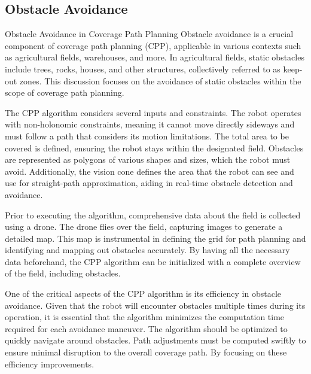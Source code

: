 
\subsection{Obstacle Avoidance}



\vspace*{6mm}  

Obstacle Avoidance in Coverage Path Planning
Obstacle avoidance is a crucial component of coverage path planning (CPP), applicable in various contexts such as agricultural fields, warehouses, and more. In agricultural fields, static obstacles include trees, rocks, houses, and other structures, collectively referred to as keep-out zones. This discussion focuses on the avoidance of static obstacles within the scope of coverage path planning.

\vspace*{6mm}  


The CPP algorithm considers several inputs and constraints. The robot operates with non-holonomic constraints, meaning it cannot move directly sideways and must follow a path that considers its motion limitations. The total area to be covered is defined, ensuring the robot stays within the designated field. Obstacles are represented as polygons of various shapes and sizes, which the robot must avoid. Additionally, the vision cone defines the area that the robot can see and use for straight-path approximation, aiding in real-time obstacle detection and avoidance.

\vspace*{6mm}  

Prior to executing the algorithm, comprehensive data about the field is collected using a drone. The drone flies over the field, capturing images to generate a detailed map. This map is instrumental in defining the grid for path planning and identifying and mapping out obstacles accurately. By having all the necessary data beforehand, the CPP algorithm can be initialized with a complete overview of the field, including obstacles.

\vspace*{6mm}  

One of the critical aspects of the CPP algorithm is its efficiency in obstacle avoidance. Given that the robot will encounter obstacles multiple times during its operation, it is essential that the algorithm minimizes the computation time required for each avoidance maneuver. The algorithm should be optimized to quickly navigate around obstacles. Path adjustments must be computed swiftly to ensure minimal disruption to the overall coverage path. By focusing on these efficiency improvements.



